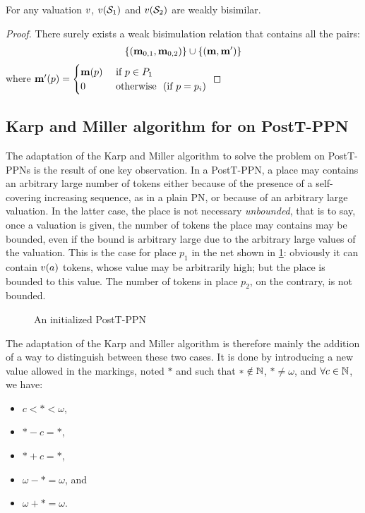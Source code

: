 \begin{lemm}
  For any valuation $\val$, $\val[{\namePPN[1]}]$ and $\val[{\namePPN[2]}]$ are weakly bisimilar.
 \end{lemm}

\begin{proof}
  There surely exists a weak bisimulation relation that contains all the pairs:
  \begin{align*}
    \{ ( \mathbf{m}_{0,1}, \mathbf{m}_{0,2} ) \}
    \cup
    \{ (\mathbf{m}, \mathbf{m}') \}
  \end{align*}
  where $\mathbf{m}'(p) = \begin{cases}\mathbf{m}(p) &\text{ if } p \in P_1\\0&\text{ otherwise }\text{ (if $p = p_i$)}\end{cases}$
\end{proof}

\subsection{Karp and Miller algorithm for \Ecov on PostT-\ac{PPN}}
\label{sec:km-ecov-postt-ppn}

The adaptation of the Karp and Miller algorithm to solve the \Ecov problem on PostT-\acp{PPN} is the result of one key observation.
In a PostT-\ac{PPN}, a place may contains an arbitrary large number of tokens either because of the presence of a self-covering increasing sequence, as in a plain \ac{PN}, or because of an arbitrary large valuation.
In the latter case, the place is not necessary \emph{unbounded}, that is to say, once a valuation is given, the number of tokens the place may contains may be bounded, even if the bound is arbitrary large due to the arbitrary large values of the valuation.
This is the case for place $p_1$ in the net shown in \cref{fig:postt-ppn-bound}: obviously it can contain $\val(\param)$ tokens, whose value may be arbitrarily high; but the place is bounded to this value.
The number of tokens in place $p_2$, on the contrary, is not bounded.

\begin{figure}[htbp]
  \centering
  
  \par
  \caption{An initialized PostT-\ac{PPN}}
  \label{fig:postt-ppn-bound}
\end{figure}

The adaptation of the Karp and Miller algorithm is therefore mainly the addition of a way to distinguish between these two cases.
It is done by introducing a new value allowed in the markings, noted $*$ and such that $* \notin \mathbb{N}$, $* \neq \omega$, and $\forall c \in \mathbb{N}$, we have:
\begin{itemize}
  \item $c < * < \omega$,
  \item $* - c = *$,
  \item $* + c = *$,
  \item $\omega - * = \omega$, and
  \item $\omega + * = \omega$.
\end{itemize}

